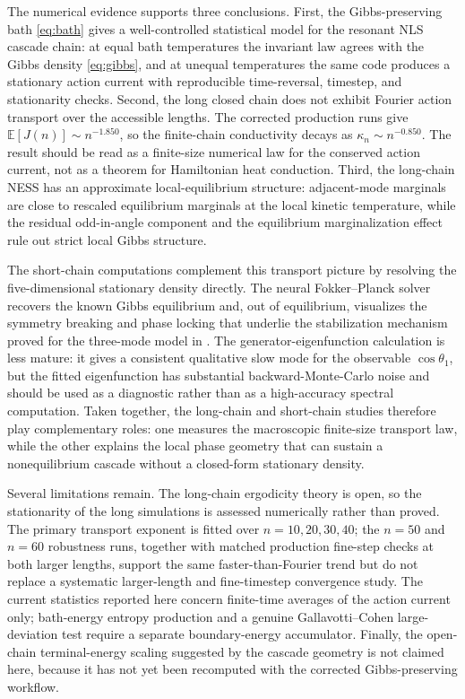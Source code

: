 \documentclass[11pt,a4paper]{article}
\theoremstyle{definition}
\newcommand{\E}{\mathbb{E}}
\numberwithin{equation}{section}   %
\begin{document}
The numerical evidence supports three conclusions. First, the
Gibbs-preserving bath \eqref{eq:bath} gives a well-controlled statistical model
for the resonant NLS cascade chain: at equal bath temperatures the invariant
law agrees with the Gibbs density \eqref{eq:gibbs}, and at unequal temperatures
the same code produces a stationary action current with reproducible
time-reversal, timestep, and stationarity checks. Second, the long closed chain
does not exhibit Fourier action transport over the accessible lengths. The
corrected production runs give $\E[J(n)]\sim n^{-1.850}$, so the finite-chain
conductivity decays as $\kappa_n\sim n^{-0.850}$. The result should be read as
a finite-size numerical law for the conserved action current, not as a theorem
for Hamiltonian heat conduction. Third, the long-chain NESS has an approximate
local-equilibrium structure: adjacent-mode marginals are close to rescaled
equilibrium marginals at the local kinetic temperature, while the residual
odd-in-angle component and the equilibrium marginalization effect rule out
strict local Gibbs structure.

The short-chain computations complement this transport picture by resolving the
five-dimensional stationary density directly. The neural Fokker--Planck solver
recovers the known Gibbs equilibrium and, out of equilibrium, visualizes the
symmetry breaking and phase locking that underlie the stabilization mechanism
proved for the three-mode model in \cite{HLNS}. The generator-eigenfunction
calculation is less mature: it gives a consistent qualitative slow mode for the
observable $\cos\theta_1$, but the fitted eigenfunction has substantial
backward-Monte-Carlo noise and should be used as a diagnostic rather than as a
high-accuracy spectral computation. Taken together, the long-chain and
short-chain studies therefore play complementary roles: one measures the
macroscopic finite-size transport law, while the other explains the local
phase geometry that can sustain a nonequilibrium cascade without a closed-form
stationary density.

Several limitations remain. The long-chain ergodicity theory is open, so the
stationarity of the long simulations is assessed numerically rather than
proved. The primary transport exponent is fitted over $n=10,20,30,40$; the
$n=50$ and $n=60$ robustness runs, together with matched production
fine-step checks at both larger lengths,
support the same faster-than-Fourier trend but do not replace a systematic
larger-length and fine-timestep convergence study. The current statistics reported here concern finite-time averages of
the action current only; bath-energy entropy production and a genuine
Gallavotti--Cohen large-deviation test require a separate boundary-energy
accumulator. Finally, the open-chain terminal-energy scaling suggested by the
cascade geometry is not claimed here, because it has not yet been recomputed
with the corrected Gibbs-preserving workflow.
\end{document}
